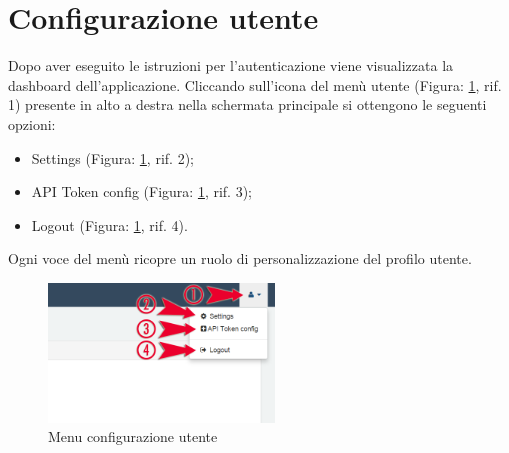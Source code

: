 %

\section{Configurazione utente} %
\label{sec:configurazione_utente}
	Dopo aver eseguito le istruzioni per l'autenticazione\gloss{} viene visualizzata la dashboard\gloss{} dell’applicazione.\newline
	Cliccando sull'icona del menù utente (Figura: \ref{fig:menu_configurazione_utente}, rif. 1) presente in alto a destra nella schermata principale si ottengono le seguenti opzioni:
	\begin{itemize}
		\item Settings (Figura: \ref{fig:menu_configurazione_utente}, rif. 2);
		\item API Token config (Figura: \ref{fig:menu_configurazione_utente}, rif. 3);
		\item Logout (Figura: \ref{fig:menu_configurazione_utente}, rif. 4).
	\end{itemize}
	Ogni voce del menù ricopre un ruolo di personalizzazione del profilo utente.
	\begin{figure}[H]
		\centering
		\centerline{\includegraphics[width=6cm]{images/menu_configurazione_utente.png}}
		\caption{Menu configurazione utente}
		\label{fig:menu_configurazione_utente}
	\end{figure}


	\pagebreak
